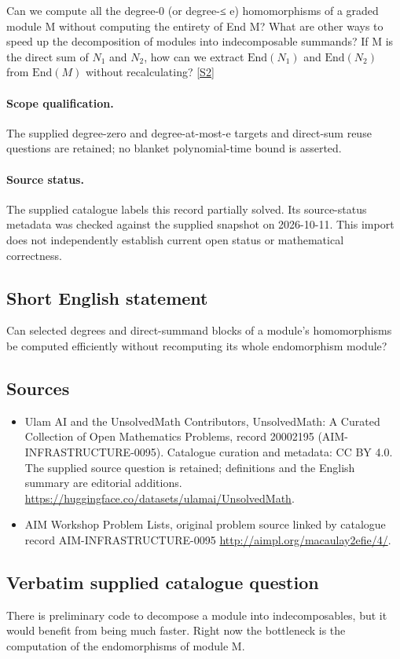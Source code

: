 \documentclass[11pt]{article}
\begin{document}
Can we compute all the degree-0 (or degree-≤ e) homomorphisms of a graded module M without computing the entirety of End M? What are other ways to speed up the decomposition of modules into indecomposable summands? If M is the direct sum of $N_1$ and $N_2$, how can we extract $\mathrm{End}(N_1)$ and $\mathrm{End}(N_2)$ from $\mathrm{End}(M)$ without recalculating? \href{http://aimpl.org/macaulay2efie/4/}{[S2]}
\paragraph{Scope qualification.}
The supplied degree-zero and degree-at-most-e targets and direct-sum reuse questions are retained; no blanket polynomial-time bound is asserted.
\paragraph{Source status.}
The supplied catalogue labels this record partially solved. Its source-status metadata was checked against the supplied snapshot on 2026-10-11. This import does not independently establish current open status or mathematical correctness.
\subsection{Short English statement}
Can selected degrees and direct-summand blocks of a module's homomorphisms be computed efficiently without recomputing its whole endomorphism module?
\subsection{Sources}
\begin{itemize}
\item[S1] Ulam AI and the UnsolvedMath Contributors, UnsolvedMath: A Curated Collection of Open Mathematics Problems, record 20002195 (AIM-INFRASTRUCTURE-0095). Catalogue curation and metadata: CC BY 4.0. The supplied source question is retained; definitions and the English summary are editorial additions.
\url{https://huggingface.co/datasets/ulamai/UnsolvedMath}.
\item[S2] AIM Workshop Problem Lists, original problem source linked by catalogue record AIM-INFRASTRUCTURE-0095
\url{http://aimpl.org/macaulay2efie/4/}.
\end{itemize}
\subsection{Verbatim supplied catalogue question}
There is preliminary code to decompose a module into indecomposables, but it would benefit from being much faster. Right now the bottleneck is the computation of the endomorphisms of module M.
\end{document}
